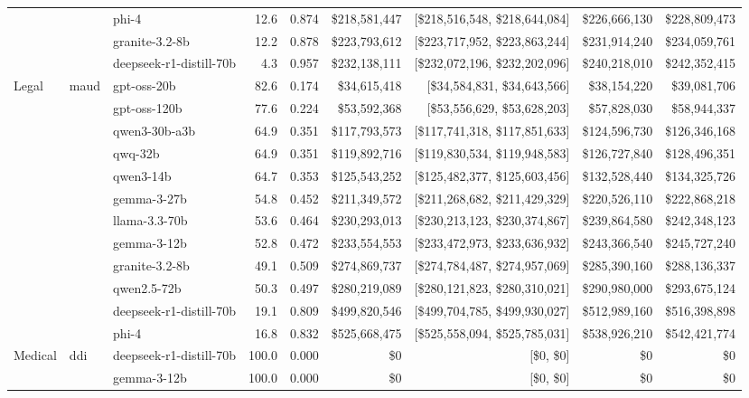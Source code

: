 \begin{table}[t]
\begin{tabular}{lllrrrrrr}
   &  & phi-4 & 12.6 & 0.874 & \$218,581,447 & [\$218,516,548, \$218,644,084] & \$226,666,130 & \$228,809,473 \\
   &  & granite-3.2-8b & 12.2 & 0.878 & \$223,793,612 & [\$223,717,952, \$223,863,244] & \$231,914,240 & \$234,059,761 \\
   &  & deepseek-r1-distill-70b & 4.3 & 0.957 & \$232,138,111 & [\$232,072,196, \$232,202,096] & \$240,218,010 & \$242,352,415 \\
\midrule
  Legal & maud & gpt-oss-20b & 82.6 & 0.174 & \$34,615,418 & [\$34,584,831, \$34,643,566] & \$38,154,220 & \$39,081,706 \\
   &  & gpt-oss-120b & 77.6 & 0.224 & \$53,592,368 & [\$53,556,629, \$53,628,203] & \$57,828,030 & \$58,944,337 \\
   &  & qwen3-30b-a3b & 64.9 & 0.351 & \$117,793,573 & [\$117,741,318, \$117,851,633] & \$124,596,730 & \$126,346,168 \\
   &  & qwq-32b & 64.9 & 0.351 & \$119,892,716 & [\$119,830,534, \$119,948,583] & \$126,727,840 & \$128,496,351 \\
   &  & qwen3-14b & 64.7 & 0.353 & \$125,543,252 & [\$125,482,377, \$125,603,456] & \$132,528,440 & \$134,325,726 \\
   &  & gemma-3-27b & 54.8 & 0.452 & \$211,349,572 & [\$211,268,682, \$211,429,329] & \$220,526,110 & \$222,868,218 \\
   &  & llama-3.3-70b & 53.6 & 0.464 & \$230,293,013 & [\$230,213,123, \$230,374,867] & \$239,864,580 & \$242,348,123 \\
   &  & gemma-3-12b & 52.8 & 0.472 & \$233,554,553 & [\$233,472,973, \$233,636,932] & \$243,366,540 & \$245,727,240 \\
   &  & granite-3.2-8b & 49.1 & 0.509 & \$274,869,737 & [\$274,784,487, \$274,957,069] & \$285,390,160 & \$288,136,337 \\
   &  & qwen2.5-72b & 50.3 & 0.497 & \$280,219,089 & [\$280,121,823, \$280,310,021] & \$290,980,000 & \$293,675,124 \\
   &  & deepseek-r1-distill-70b & 19.1 & 0.809 & \$499,820,546 & [\$499,704,785, \$499,930,027] & \$512,989,160 & \$516,398,898 \\
   &  & phi-4 & 16.8 & 0.832 & \$525,668,475 & [\$525,558,094, \$525,785,031] & \$538,926,210 & \$542,421,774 \\
\midrule
  Medical & ddi & deepseek-r1-distill-70b & 100.0 & 0.000 & \$0 & [\$0, \$0] & \$0 & \$0 \\
   &  & gemma-3-12b & 100.0 & 0.000 & \$0 & [\$0, \$0] & \$0 & \$0 \\

\end{tabular}
\end{table}
